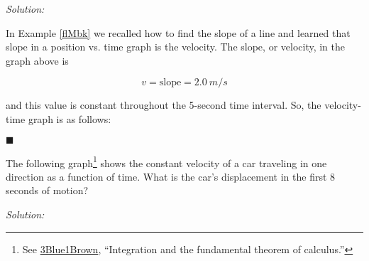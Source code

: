 \documentclass[dvipsnames]{article}
\begin{document}
\textit{Solution:}

In Example \ref{flMbk} we recalled how to find the slope of a line and learned that slope in a position vs. time graph is the velocity. The slope, or velocity, in the graph above is

\begin{equation*}
    v = \text{slope} = \SI{2.0}{m/s}
\end{equation*}

and this value is constant throughout the 5-second time interval. So, the velocity-time graph is as follows:

\begin{center}
\end{center}

\hfill $\blacksquare$

\begin{example}
The following graph\footnote{See \href{https://youtu.be/rfG8ce4nNh0?si=YnRiAhbPOc-2eW6s&t=162}{3Blue1Brown}, ``Integration and the fundamental theorem of calculus.''} shows the constant velocity of a car traveling in one direction as a function of time. What is the car's displacement in the first 8 seconds of motion?

\begin{center}
\end{center}
\end{example}

\textit{Solution:}
\end{document}
